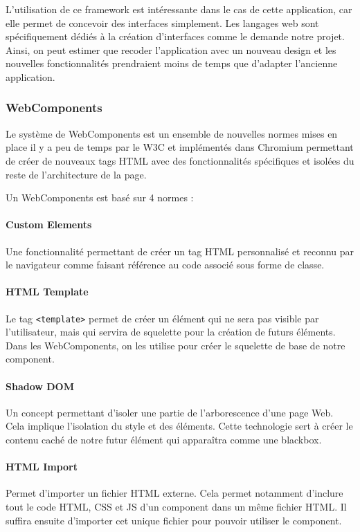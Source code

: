 L'utilisation de ce framework est intéressante dans le cas de cette application, car elle permet de concevoir des interfaces simplement.
Les langages web sont spécifiquement dédiés à la création d'interfaces comme le demande notre projet.
Ainsi, on peut estimer que recoder l'application avec un nouveau design et les nouvelles fonctionnalités prendraient moins de temps que d'adapter l'ancienne application.

\subsubsection{WebComponents}
\label{webcomponents}

Le système de WebComponents est un ensemble de nouvelles normes mises en place il y a peu de temps par le W3C et implémentés dans Chromium permettant de créer de nouveaux tags HTML avec des fonctionnalités spécifiques et isolées du reste de l'architecture de la page.

\bigskip

Un WebComponents est basé sur 4 normes :

\paragraph{Custom Elements} Une fonctionnalité permettant de créer un tag HTML personnalisé et reconnu par le navigateur comme faisant référence au code associé sous forme de classe.

\paragraph{HTML Template} Le tag \texttt{<template>} permet de créer un élément qui ne sera pas visible par l'utilisateur, mais qui servira de squelette pour la création de futurs éléments.
Dans les WebComponents, on les utilise pour créer le squelette de base de notre component.

\paragraph{Shadow DOM} Un concept permettant d'isoler une partie de l'arborescence d'une page Web.
Cela implique l'isolation du style et des éléments.
Cette technologie sert à créer le contenu caché de notre futur élément qui apparaîtra comme une blackbox.

\paragraph{HTML Import} Permet d'importer un fichier HTML externe.
Cela permet notamment d'inclure tout le code HTML, CSS et JS d'un component dans un même fichier HTML.
Il suffira ensuite d'importer cet unique fichier pour pouvoir utiliser le component.

